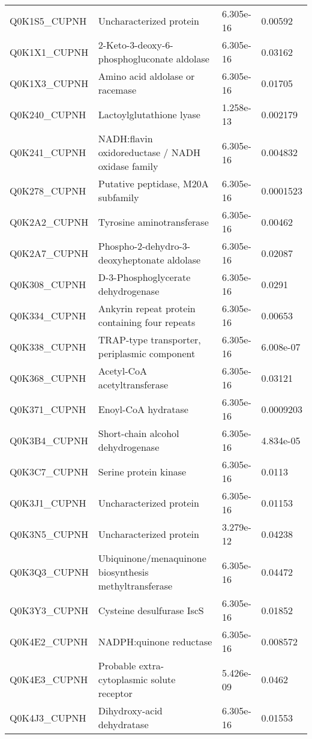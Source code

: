 \begin{center}
\begin{longtable}{ l l l l }
Q0K1S5\_CUPNH & Uncharacterized protein& 6.305e-16 & 0.00592 \\ [0.5ex]
Q0K1X1\_CUPNH & 2-Keto-3-deoxy-6-phosphogluconate aldolase& 6.305e-16 & 0.03162 \\ [0.5ex]
Q0K1X3\_CUPNH & Amino acid aldolase or racemase& 6.305e-16 & 0.01705 \\ [0.5ex]
Q0K240\_CUPNH & Lactoylglutathione lyase& 1.258e-13 & 0.002179 \\ [0.5ex]
Q0K241\_CUPNH & NADH:flavin oxidoreductase / NADH oxidase family& 6.305e-16 & 0.004832 \\ [0.5ex]
Q0K278\_CUPNH & Putative peptidase, M20A subfamily& 6.305e-16 & 0.0001523 \\ [0.5ex]
Q0K2A2\_CUPNH & Tyrosine aminotransferase& 6.305e-16 & 0.00462 \\ [0.5ex]
Q0K2A7\_CUPNH & Phospho-2-dehydro-3-deoxyheptonate aldolase& 6.305e-16 & 0.02087 \\ [0.5ex]
Q0K308\_CUPNH & D-3-Phosphoglycerate dehydrogenase& 6.305e-16 & 0.0291 \\ [0.5ex]
Q0K334\_CUPNH & Ankyrin repeat protein containing four repeats& 6.305e-16 & 0.00653 \\ [0.5ex]
Q0K338\_CUPNH & TRAP-type transporter, periplasmic component& 6.305e-16 & 6.008e-07 \\ [0.5ex]
Q0K368\_CUPNH & Acetyl-CoA acetyltransferase& 6.305e-16 & 0.03121 \\ [0.5ex]
Q0K371\_CUPNH & Enoyl-CoA hydratase& 6.305e-16 & 0.0009203 \\ [0.5ex]
Q0K3B4\_CUPNH & Short-chain alcohol dehydrogenase& 6.305e-16 & 4.834e-05 \\ [0.5ex]
Q0K3C7\_CUPNH & Serine protein kinase& 6.305e-16 & 0.0113 \\ [0.5ex]
Q0K3J1\_CUPNH & Uncharacterized protein& 6.305e-16 & 0.01153 \\ [0.5ex]
Q0K3N5\_CUPNH & Uncharacterized protein& 3.279e-12 & 0.04238 \\ [0.5ex]
Q0K3Q3\_CUPNH & Ubiquinone/menaquinone biosynthesis methyltransferase& 6.305e-16 & 0.04472 \\ [0.5ex]
Q0K3Y3\_CUPNH & Cysteine desulfurase IscS& 6.305e-16 & 0.01852 \\ [0.5ex]
Q0K4E2\_CUPNH & NADPH:quinone reductase & 6.305e-16 & 0.008572 \\ [0.5ex]
Q0K4E3\_CUPNH & Probable extra-cytoplasmic solute receptor& 5.426e-09 & 0.0462 \\ [0.5ex]
Q0K4J3\_CUPNH & Dihydroxy-acid dehydratase& 6.305e-16 & 0.01553 \\ [0.5ex]

\end{longtable}
\end{center}
